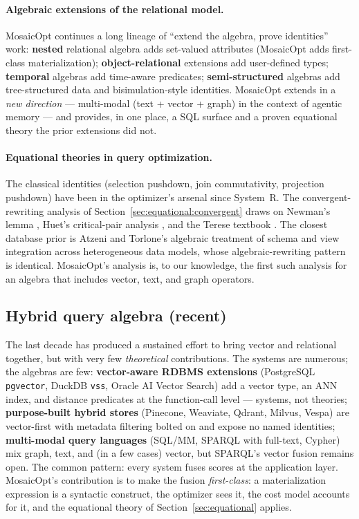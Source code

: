 \documentclass[acmsmall,review,anonymous]{acmart}
\theoremstyle{plain}
\theoremstyle{definition}
\theoremstyle{remark}
\begin{document}
\paragraph{Algebraic extensions of the relational model.}
MosaicOpt continues a long lineage of ``extend the algebra, prove
identities'' work: \textbf{nested} relational algebra
\cite{thomasfischer1986} adds set-valued attributes (MosaicOpt
adds first-class materialization); \textbf{object-relational}
extensions \cite{beech1988} add user-defined types; \textbf{temporal}
algebras \cite{tuzhilinclifford1990,snodgrass1995} add time-aware
predicates; \textbf{semi-structured} algebras
\cite{fernandezsimeonwadler2000} add tree-structured data and
bisimulation-style identities. MosaicOpt extends in a
\emph{new direction} --- multi-modal (text + vector + graph) in the
context of agentic memory --- and provides, in one place, a SQL
surface and a proven equational theory the prior extensions did
not.

\paragraph{Equational theories in query optimization.}
The classical identities (selection pushdown, join commutativity,
projection pushdown) have been in the optimizer's arsenal since
System~R. The convergent-rewriting analysis of
Section~\ref{sec:equational:convergent} draws on Newman's lemma
\cite{newman1942}, Huet's critical-pair analysis \cite{huet1980},
and the Terese textbook \cite{terese2003}. The closest database
prior is Atzeni and Torlone's \cite{atzenitorlone1996} algebraic
treatment of schema and view integration across heterogeneous
data models, whose algebraic-rewriting pattern is identical.
MosaicOpt's analysis is, to our knowledge, the first such analysis
for an algebra that includes vector, text, and graph operators.

\subsection{Hybrid query algebra (recent)}

The last decade has produced a sustained effort to bring vector and
relational together, but with very few \emph{theoretical}
contributions. The systems are numerous; the algebras are few:
\textbf{vector-aware RDBMS extensions} (PostgreSQL
\texttt{pgvector}, DuckDB \texttt{vss}, Oracle AI Vector Search)
add a vector type, an ANN index, and distance predicates at the
function-call level --- systems, not theories;
\textbf{purpose-built hybrid stores} (Pinecone, Weaviate, Qdrant,
Milvus, Vespa) are vector-first with metadata filtering bolted on
and expose no named identities; \textbf{multi-modal query languages}
(SQL/MM, SPARQL with full-text, Cypher) mix graph, text, and
(in a few cases) vector, but SPARQL's vector fusion remains open.
The common pattern: every system fuses scores at the application
layer. MosaicOpt's contribution is to make the fusion
\emph{first-class}: a materialization expression is a syntactic
construct, the optimizer sees it, the cost model accounts for it,
and the equational theory of Section~\ref{sec:equational} applies.
\end{document}
